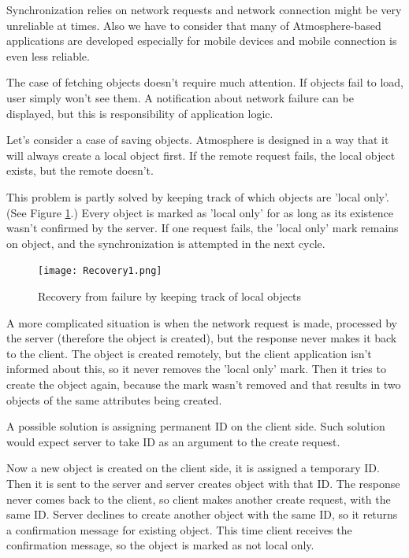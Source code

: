 Synchronization relies on network requests and network connection might be very unreliable at times. Also we have to consider that many of Atmosphere-based applications are developed especially for mobile devices and mobile connection is even less reliable.

The case of fetching objects doesn't require much attention. If objects fail to load, user simply won't see them. A notification about network failure can be displayed, but this is responsibility of application logic.

Let's consider a case of saving objects. Atmosphere is designed in a way that it will always create a local object first. If the remote request fails, the local object exists, but the remote doesn't.

This problem is partly solved by keeping track of which objects are 'local only'. (See Figure \ref{fig:recovery1}.) Every object is marked as 'local only' for as long as its existence wasn't confirmed by the server.  If one request fails,  the 'local only' mark remains on object,  and the synchronization is attempted in the next cycle. 

\begin{figure}[htbp]
  \centering
    \texttt{[image: Recovery1.png]}
  \caption{Recovery from failure by keeping track of local objects}
  \label{fig:recovery1}
\end{figure}

A more complicated situation is when the network request is made, processed by the server (therefore the object is created), but the response never makes it back to the client. The object is created remotely, but the client application isn’t informed about this, so it never removes the 'local only' mark. Then it tries to create the object again, because the mark wasn't removed and that results in two objects of the same attributes being created.

A possible solution is assigning permanent ID on the client side. Such solution would expect server to take ID as an argument to the create request.

Now a new object is created on the client side, it is assigned a temporary ID. Then it is sent to the server and server creates object with that ID. The response never comes back to the client, so client makes another create request, with the same ID. Server declines to create another object with the same ID, so it returns a confirmation message for existing object. This time client receives the confirmation message, so the object is marked as not local only.

